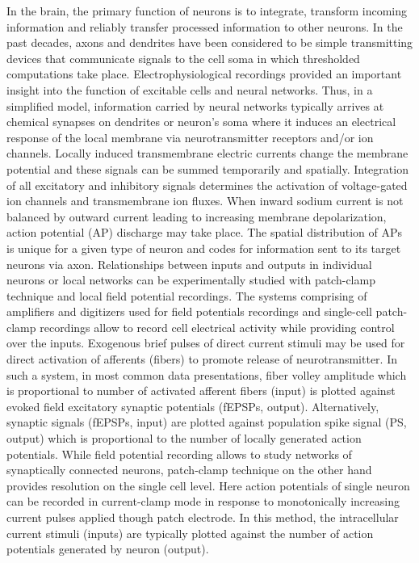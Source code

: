 \documentclass[fleqn,10pt]{wlscirep}
\begin{document}
In the brain, the primary function of neurons is to integrate, transform incoming information and reliably transfer processed information to other neurons. In the past decades, axons and dendrites have been considered to be simple transmitting devices that communicate signals to the cell soma in which thresholded computations take place. Electrophysiological recordings provided an important insight into the function of excitable cells and neural networks. Thus, in a simplified model, information carried by neural networks typically arrives at chemical synapses on dendrites or neuron’s soma where it induces an electrical response of the local membrane via neurotransmitter receptors and/or ion channels. Locally induced transmembrane electric currents change the membrane potential and these signals can be summed temporarily and spatially. Integration of all excitatory and inhibitory signals determines the activation of voltage-gated ion channels and transmembrane ion fluxes. When inward sodium current is not balanced by outward current leading to increasing membrane depolarization, action potential (AP) discharge may take place. The spatial distribution of APs is unique for a given type of neuron and codes for information sent to its target neurons via axon. 
Relationships between inputs and outputs in individual neurons or local networks can be experimentally studied with patch-clamp technique\cite{Nagaeva2021-jt} and local field potential recordings\cite{Tetteh2019-ts}. The systems comprising of amplifiers and digitizers used for field potentials recordings and single-cell patch-clamp recordings allow to record cell electrical activity while providing control over the inputs. Exogenous brief pulses of direct current stimuli may be used for direct activation of afferents (fibers) to promote release of neurotransmitter. In such a system, in most common data presentations, fiber volley amplitude which is proportional to number of activated afferent fibers (input) is plotted against evoked field excitatory synaptic potentials (fEPSPs, output). Alternatively, synaptic signals (fEPSPs, input) are plotted against population spike signal (PS, output) which  is proportional to the number of locally generated action potentials. While field potential recording allows to study networks of synaptically connected neurons, patch-clamp technique on the other hand provides resolution on the single cell level. Here action potentials of single neuron can be recorded in current-clamp mode in response to monotonically increasing current pulses applied though patch electrode\cite{Chaichim2021-wi}. In this method, the intracellular current stimuli (inputs) are typically plotted against the number of action potentials generated by neuron (output). 
\end{document}
